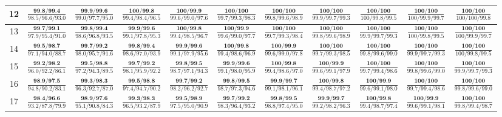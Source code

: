 \documentclass{slides}
\begin{document}
{{{\begin{tabular}{|c|c|c|c|c|c|c|c|c|c|c|}
\hline
12 & $\frac{\textbf{99.8/99.4}}{98.5/96.6/93.0}$ & $\frac{\textbf{99.9/99.6}}{99.0/97.7/95.0}$ & $\frac{\textbf{100/99.8}}{99.4/98.4/96.5}$ & $\frac{\textbf{100/99.9}}{99.6/99.0/97.6}$ & $\frac{\textbf{100/100}}{99.7/99.3/98.3}$ & $\frac{\textbf{100/100}}{99.8/99.6/98.9}$ & $\frac{\textbf{100/100}}{99.9/99.7/99.3}$ & $\frac{\textbf{100/100}}{100/99.8/99.5}$ & $\frac{\textbf{100/100}}{100/99.9/99.7}$ & $\frac{\textbf{100/100}}{100/100/99.8}$ \\
\hline
13 & $\frac{\textbf{99.7/99.1}}{97.9/95.4/91.0}$ & $\frac{\textbf{99.8/99.4}}{98.6/96.8/93.5}$ & $\frac{\textbf{99.9/99.6}}{99.1/97.8/95.3}$ & $\frac{\textbf{100/99.8}}{99.4/98.5/96.7}$ & $\frac{\textbf{100/99.9}}{99.6/99.0/97.7}$ & $\frac{\textbf{100/100}}{99.7/99.3/98.4}$ & $\frac{\textbf{100/100}}{99.8/99.6/98.9}$ & $\frac{\textbf{100/100}}{99.9/99.7/99.3}$ & $\frac{\textbf{100/100}}{100/99.8/99.5}$ & $\frac{\textbf{100/100}}{100/99.9/99.7}$ \\
\hline
14 & $\frac{\textbf{99.5/98.7}}{97.1/94.0/88.7}$ & $\frac{\textbf{99.7/99.2}}{98.0/95.7/91.6}$ & $\frac{\textbf{99.8/99.4}}{98.6/97.0/93.9}$ & $\frac{\textbf{99.9/99.6}}{99.1/97.9/95.6}$ & $\frac{\textbf{100/99.8}}{99.4/98.6/96.9}$ & $\frac{\textbf{100/99.9}}{99.6/99.0/97.8}$ & $\frac{\textbf{100/100}}{99.7/99.3/98.5}$ & $\frac{\textbf{100/100}}{99.8/99.6/99.0}$ & $\frac{\textbf{100/100}}{99.9/99.7/99.3}$ & $\frac{\textbf{100/100}}{100/99.8/99.5}$ \\
\hline
15 & $\frac{\textbf{99.2/98.2}}{96.0/92.2/86.1}$ & $\frac{\textbf{99.5/98.8}}{97.2/94.3/89.5}$ & $\frac{\textbf{99.7/99.2}}{98.1/95.9/92.2}$ & $\frac{\textbf{99.8/99.5}}{98.7/97.1/94.3}$ & $\frac{\textbf{99.9/99.6}}{99.1/98.0/95.9}$ & $\frac{\textbf{100/99.8}}{99.4/98.6/97.0}$ & $\frac{\textbf{100/99.9}}{99.6/99.1/97.9}$ & $\frac{\textbf{100/100}}{99.7/99.4/98.6}$ & $\frac{\textbf{100/100}}{99.8/99.6/99.0}$ & $\frac{\textbf{100/100}}{99.9/99.7/99.3}$ \\
\hline
16 & $\frac{\textbf{98.9/97.5}}{94.8/90.2/83.1}$ & $\frac{\textbf{99.3/98.3}}{96.3/92.7/87.0}$ & $\frac{\textbf{99.5/98.8}}{97.4/94.7/90.2}$ & $\frac{\textbf{99.7/99.2}}{98.2/96.2/92.7}$ & $\frac{\textbf{99.8/99.5}}{98.7/97.3/94.6}$ & $\frac{\textbf{99.9/99.7}}{99.1/98.1/96.1}$ & $\frac{\textbf{100/99.8}}{99.4/98.7/97.2}$ & $\frac{\textbf{100/99.9}}{99.6/99.1/98.0}$ & $\frac{\textbf{100/100}}{99.7/99.4/98.6}$ & $\frac{\textbf{100/100}}{99.8/99.6/99.0}$ \\
\hline
17 & $\frac{\textbf{98.4/96.6}}{93.2/87.8/79.9}$ & $\frac{\textbf{98.9/97.6}}{95.1/90.8/84.3}$ & $\frac{\textbf{99.3/98.3}}{96.5/93.2/87.9}$ & $\frac{\textbf{99.5/98.9}}{97.5/95.0/90.9}$ & $\frac{\textbf{99.7/99.2}}{98.3/96.4/93.2}$ & $\frac{\textbf{99.8/99.5}}{98.8/97.4/95.0}$ & $\frac{\textbf{99.9/99.7}}{99.2/98.2/96.3}$ & $\frac{\textbf{100/99.8}}{99.4/98.7/97.4}$ & $\frac{\textbf{100/99.9}}{99.6/99.1/98.1}$ & $\frac{\textbf{100/100}}{99.8/99.4/98.7}$ \\

\end{tabular}}}}
\end{document}
